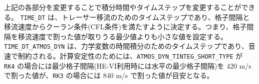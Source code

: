 上記の各部分を変更することで積分時間やタイムステップを変更することができる。
\verb|TIME_DT| は、トレーサー移流のためのタイムステップであり、格子間隔と移流速度からクーラン条件(CFL条件)を満たすように決定する。つまり、格子間隔を移流速度で割った値が取りうる最少値よりも小さな値を設定する。
\verb|TIME_DT_ATMOS_DYN| は、力学変数の時間積分のためのタイムステップであり、音速で制約される。計算安定性のためには、\verb|ATMOS_DYN_TINTEG_SHORT_TYPE| が \verb|RK4| の場合には最少格子間隔(HE-VI利用時には水平の最少格子間隔)を 420 m/s で割った値が、\verb|RK3| の場合には 840 m/s で割った値が目安となる。


